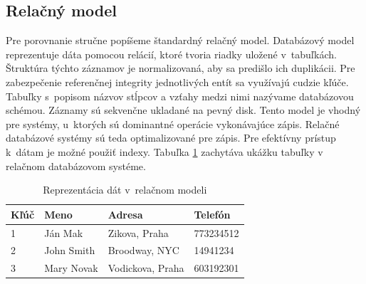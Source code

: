\documentclass[11pt,twoside,a4paper]{book}
\begin{document}

\subsection{Relačný model}
Pre porovnanie stručne popíšeme štandardný relačný model. Databázový model reprezentuje dáta pomocou relácií, ktoré tvoria riadky uložené v~tabuľkách. Štruktúra týchto záznamov je normalizovaná, aby sa predišlo ich duplikácii. Pre zabezpečenie referenčnej integrity jednotlivých entít sa využívajú cudzie kľúče. Tabuľky s~popisom názvov stĺpcov a vzťahy medzi nimi nazývame databázovou schémou. Záznamy sú sekvenčne ukladané na pevný disk. Tento model je vhodný pre systémy, u~ktorých sú dominantné operácie vykonávajúce zápis. Relačné databázové systémy sú teda optimalizované pre zápis. Pre efektívny prístup k~dátam je možné použiť indexy. Tabuľka \ref{tab:relacnyModel} zachytáva ukážku tabuľky v relačnom databázovom systéme.



\begin{table}[hp]
\begin{center}
    \begin{tabular}{l|l|l|l}

  Kľúč & Meno & Adresa & Telefón\\ \hline

  1&Ján Mak & Zikova, Praha & 773234512 \\
  2&John Smith  & Broodway, NYC & 14941234\\
  3&Mary Novak & Vodickova, Praha & 603192301\\

    \end{tabular}
\end{center}
\caption{Reprezentácia dát v~relačnom modeli}
\label{tab:relacnyModel}
\end{table}
\end{document}
